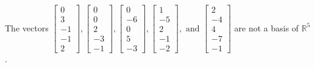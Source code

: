 \begin{exercise}
\begin{exerciseStatement}
  \end{exerciseStatement}
  \begin{exerciseAnswer}
   The vectors \(\left[\begin{array}{r}
0 \\
3 \\
-1 \\
-1 \\
2
\end{array}\right] , \left[\begin{array}{r}
0 \\
0 \\
2 \\
-3 \\
-1
\end{array}\right] , \left[\begin{array}{r}
0 \\
-6 \\
0 \\
5 \\
-3
\end{array}\right] , \left[\begin{array}{r}
1 \\
-5 \\
2 \\
-1 \\
-2
\end{array}\right] , \text{ and } \left[\begin{array}{r}
2 \\
-4 \\
4 \\
-7 \\
-1
\end{array}\right]\) 
  	 are not  a basis of \(\mathbb{R}^5\).
  


  \end{exerciseAnswer}
\end{exercise}